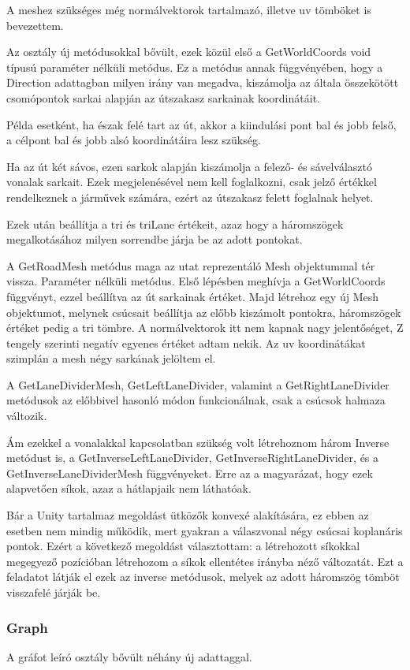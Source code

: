 A meshez szükséges még normálvektorok tartalmazó, illetve uv tömböket is bevezettem.

Az osztály új metódusokkal bővült, ezek közül első a GetWorldCoords void típusú paraméter nélküli metódus. Ez a metódus annak függvényében, hogy a Direction adattagban milyen irány van megadva, kiszámolja az általa összekötött csomópontok sarkai alapján az útszakasz sarkainak koordinátáit.

Példa esetként, ha észak felé tart az út, akkor a kiindulási pont bal és jobb felső, a célpont bal és jobb alsó koordinátáira lesz szükség.

Ha az út két sávos, ezen sarkok alapján kiszámolja a felező- és sávelválasztó vonalak sarkait. Ezek megjelenésével nem kell foglalkozni, csak jelző értékkel rendelkeznek a járművek számára, ezért az útszakasz felett foglalnak helyet.

Ezek után beállítja a tri és triLane értékeit, azaz hogy a háromszögek megalkotásához milyen sorrendbe járja be az adott pontokat.


A GetRoadMesh metódus maga az utat reprezentáló Mesh objektummal tér vissza. Paraméter nélküli metódus. Első lépésben meghívja a GetWorldCoords függvényt, ezzel beállítva az út sarkainak értéket. Majd létrehoz egy új Mesh objektumot, melynek csúcsait beállítja az előbb kiszámolt pontokra, háromszögek értéket pedig a tri tömbre. A normálvektorok itt nem kapnak nagy jelentőséget, Z tengely szerinti negatív egyenes értéket adtam nekik. Az uv koordinátákat szimplán a mesh négy sarkának jelöltem el.

A GetLaneDividerMesh, GetLeftLaneDivider, valamint a GetRightLaneDivider metódusok az előbbivel hasonló módon funkcionálnak, csak a csúcsok halmaza változik.

Ám ezekkel a vonalakkal kapcsolatban szükség volt létrehoznom három Inverse metódust is, a GetInverseLeftLaneDivider, GetInverseRightLaneDivider, és a GetInverseLaneDividerMesh függvényeket. Erre az a magyarázat, hogy ezek alapvetően síkok, azaz a hátlapjaik nem láthatóak. 

Bár a Unity tartalmaz megoldást ütközők konvexé alakítására, ez ebben az esetben nem mindig működik, mert gyakran a válaszvonal négy csúcsai koplanáris pontok. Ezért a következő megoldást választottam: a létrehozott síkokkal megegyező pozícióban létrehozom a síkok ellentétes irányba néző változatát. Ezt a feladatot látják el ezek az inverse metódusok, melyek az adott háromszög tömböt visszafelé járják be.

\subsubsection{Graph}
A gráfot leíró osztály bővült néhány új adattaggal. 

